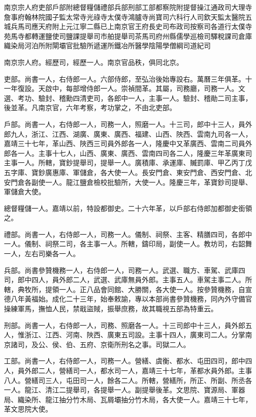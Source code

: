南京宗人府吏部戶部附總督糧儲禮部兵部刑部工部都察院附提督操江通政司大理寺詹事府翰林院國子監太常寺光祿寺太僕寺鴻臚寺尚寶司六科行人司欽天監太醫院五城兵馬司應天府附上元江寧二縣已上南京官王府長史司布政司按察司各道行太僕寺苑馬寺都轉運鹽使司鹽課提舉司市舶提舉司茶馬司府州縣儒學巡檢司驛稅課司倉庫織染局河泊所附閘壩官批驗所遞運所鐵冶所醫學陰陽學僧綱司道紀司

南京宗人府。經歷司，經歷一人。南京官品秩，俱同北京。

吏部。尚書一人，右侍郎一人。六部侍郎，至弘治後始專設右。萬曆三年俱革。十一年復設。天啟中，每部增侍郎一人。崇禎間革。其屬，司務廳，司務一人。文選、考功、驗封、稽勳四清吏司，各郎中一人，主事一人。驗封、稽勛二司主事，後並革。凡南京官，六年考察，考功掌之，不由北吏部。

戶部。尚書一人，右侍郎一人，司務一人，照磨一人。十三司，郎中十三人，員外郎九人，浙江、江西、湖廣、廣東、廣西、福建、山西、陜西、雲南九司各一人，嘉靖三十七年，革山西、陜西三司員外郎各一人，隆慶中又革廣西、雲南二司員外郎各一人。主事十七人，山西、廣東、廣西、雲南四司各二人，隆慶三年革廣東司主事一人。所轄，寶鈔提舉司，提舉一人。廣積庫、承運庫、贓罰庫、甲乙丙丁戊五字庫、寶鈔廣惠庫、軍儲倉，各大使一人。長安門倉、東安門倉、西安門倉、北安門倉各副使一人。龍江鹽倉檢校批驗所，大使一人。隆慶三年，革寶鈔司提舉、軍儲倉大使。

總督糧儲一人。嘉靖以前，特設都御史。二十六年革，以戶部右侍郎加都御史銜領之。

禮部。尚書一人，右侍郎一人，司務一人。儀制、祠祭、主客、精膳四司，各郎中一人。儀制、祠祭二司，各主事一人。所轄，鑄印局，副使一人。教坊司，右韶舞一人，左右司樂各一人。

兵部。尚書參贊機務一人，右侍郎一人，司務一人。武選、職方、車駕、武庫四司，郎中四人，員外郎二人，武選、武庫無員外郎。主事五人。車駕主事二人。所轄，典牧所，提領一人。正八品會同館、大勝關，各大使一人。按參贊機務，自宣德八年黃福始。成化二十三年，始奉敕諭，專以本部尚書參贊機務，同內外守備官操練軍馬，撫恤人民，禁戢盜賊，振舉庶務，故其職視五部為特重云。

刑部。尚書一人，右侍郎一人，司務、照磨各一人。十三司郎中十三人，員外郎五人，惟浙江、江西、河南、陜西、廣東五司設。主事十四人，廣東司二人。分掌南京諸司，及公、侯、伯、五府、京衛所刑名之事。司獄二人。

工部。尚書一人，右侍郎一人，司務一人。營繕、虞衡、都水、屯田四司，郎中四人，員外郎二人，營繕司一人，都水司一人，嘉靖三十七年，革都水員外郎。主事八人。營繕司三人，屯田司一人，餘各二人。所轄，營繕所，所正、所副、所丞各一人。龍江、清江二提舉司，各提舉一人。副提舉後革。文思院、寶源局、軍器局、織染所、龍江抽分竹木局、瓦屑壩抽分竹木局，各大使一人。嘉靖三十七年，革文思院大使。


